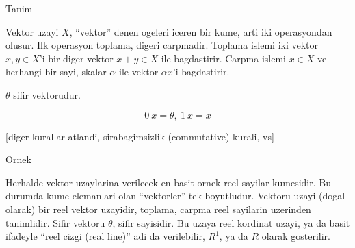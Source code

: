 \documentclass[12pt,fleqn]{article}
\begin{document}
Tanim 

Vektor uzayi $X$, ``vektor'' denen ogeleri iceren bir kume, arti iki
operasyondan olusur. Ilk operasyon toplama, digeri carpmadir. Toplama
islemi iki vektor $x,y \in X$'i bir diger vektor $x+y \in X$ ile
bagdastirir. Carpma islemi $x \in X$ ve herhangi bir sayi, skalar $\alpha$
ile vektor $\alpha x$'i bagdastirir. 

$\theta$ sifir vektorudur. 

\[ 0 \ x = \theta, \ 1 \ x = x \]

[diger kurallar atlandi, sirabagimsizlik (commutative) kurali, vs]

Ornek

Herhalde vektor uzaylarina verilecek en basit ornek reel sayilar
kumesidir. Bu durumda kume elemanlari olan ``vektorler'' tek
boyutludur. Vektoru uzayi (dogal olarak) bir reel vektor uzayidir, toplama,
carpma reel sayilarin uzerinden tanimlidir. Sifir vektoru $\theta$, sifir
sayisidir. Bu uzaya reel kordinat uzayi, ya da basit ifadeyle ``reel cizgi
(real line)'' adi da verilebilir, $R^1$, ya da $R$ olarak gosterilir. 
\end{document}
